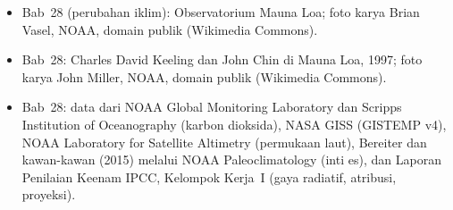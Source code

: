 \begin{itemize}
  \item Bab~28 (perubahan iklim): Observatorium Mauna Loa; foto karya Brian Vasel, NOAA, domain publik (Wikimedia Commons).
  \item Bab~28: Charles David Keeling dan John Chin di Mauna Loa, 1997; foto karya John Miller, NOAA, domain publik (Wikimedia Commons).
  \item Bab~28: data dari NOAA Global Monitoring Laboratory dan Scripps Institution of Oceanography (karbon dioksida), NASA GISS (GISTEMP v4), NOAA Laboratory for Satellite Altimetry (permukaan laut), Bereiter dan kawan-kawan (2015) melalui NOAA Paleoclimatology (inti es), dan Laporan Penilaian Keenam IPCC, Kelompok Kerja~I (gaya radiatif, atribusi, proyeksi).
\end{itemize}
